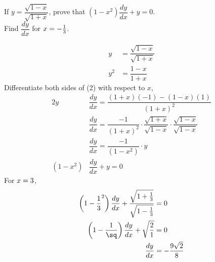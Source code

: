 

\SQUARE{\vbone}\sq

\question If $y=\dfrac{\sqrt{1-x}}{\sqrt{1+x}}$, prove that
$(1-x^2)\dfrac{dy}{dx}+y=0$. \\
Find $\dfrac{dy}{dx}$ for $x=-\frac{1}{3}$.

\watchout

\begin{solution}
  \begin{align}
    y  &=\dfrac{\sqrt{1-x}}{\sqrt{1+x}} \\
    y^2&=\dfrac{1-x}{1+x}
  \end{align}
  Differentiate both sides of (2) with respect to $x$,
  \begin{align}
         2y &\dfrac{dy}{dx}=\dfrac{(1+x)(-1)-(1-x)(1)}{(1+x)^2} \\
            &\dfrac{dy}{dx}=\dfrac{-1}{(1+x)^2}
                            \cdot\dfrac{\sqrt{1+x}}{\sqrt{1-x}}
                            \cdot\dfrac{\sqrt{1-x}}{\sqrt{1-x}} \\
            &\dfrac{dy}{dx}=\dfrac{-1}{(1-x^2)}\cdot y \\
    (1-x^2) &\dfrac{dy}{dx}+y=0
  \end{align}
  For $x=3$,
  \begin{align}
    \left(1-{\dfrac{1}{\vbone}}^2\right)\dfrac{dy}{dx} +
      \dfrac{\sqrt{1\vbthree\frac{1}{\vbone}}}
            {\sqrt{1\vbfour\frac{1}{\vbone}}}&=0 \\
    \left(1-\dfrac{1}{\sq}\right)
      \dfrac{dy}{dx}+\sqrt{\dfrac{\vbfive}{\vbsix}} &=0 \\
      \dfrac{dy}{dx}&=\vbseven
  \end{align}
\end{solution}

